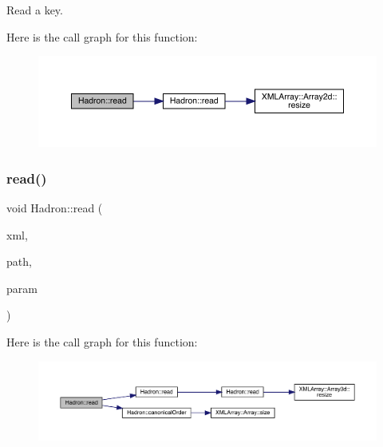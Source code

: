 Read a key. 

Here is the call graph for this function\+:\nopagebreak
\begin{figure}[H]
\begin{center}
\leavevmode
\includegraphics[width=350pt]{d1/daf/namespaceHadron_a9c6649bbe7b32cbc5fcbf8ebbf17d987_cgraph}
\end{center}
\end{figure}
\mbox{\label{namespaceHadron_ab955c28b5566e0df089a26a611d4bf03}} 
\subsubsection{\texorpdfstring{read()}{read()}\hspace{0.1cm}{\footnotesize\ttfamily [31/94]}}
{\footnotesize\ttfamily void Hadron\+::read (\begin{DoxyParamCaption}\item[{\mbox{\hyperlink{classADATXML_1_1XMLReader}{X\+M\+L\+Reader}} \&}]{xml,  }\item[{const std\+::string \&}]{path,  }\item[{\mbox{\hyperlink{structHadron_1_1KeyHadronNPartIrrepOp__t_1_1CGPair__t_1_1Slot__t}{Key\+Hadron\+N\+Part\+Irrep\+Op\+\_\+t\+::\+C\+G\+Pair\+\_\+t\+::\+Slot\+\_\+t}} \&}]{param }\end{DoxyParamCaption})}

Here is the call graph for this function\+:\nopagebreak
\begin{figure}[H]
\begin{center}
\leavevmode
\includegraphics[width=350pt]{d1/daf/namespaceHadron_ab955c28b5566e0df089a26a611d4bf03_cgraph}
\end{center}
\end{figure}
\mbox{\label{namespaceHadron_a067d20ab6ec9071306d6db3a7e7cb4fd}} 
